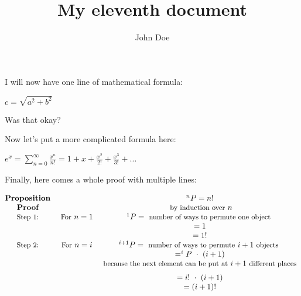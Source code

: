 \documentclass{article}
\title{My eleventh document}
\author{John Doe}
\renewcommand{\t}[1]{~\text{\small{#1}}~}
\begin{document}
   \maketitle
   I will now have one line of mathematical formula:
   
   $c = \sqrt{a^2 + b^2}$
   
   Was that okay?
   
   Now let's put a more complicated formula here:
   
   $e^x = \displaystyle\sum^{\infty}_{n=0} \frac{x^n}{n!}
        = 1 + x + \frac{x^2}{2!} + \frac{x^3}{3!} + ...$
   
   Finally, here comes a whole proof with multiple lines:
   
\[\begin{matrix}

\textbf{Proposition} &               & ^{n}P = n! \\
\textbf{Proof}       &               & \t{by induction over}n \\
\t{Step 1:}          & \t{For} n = 1 & ^{1}P = \t{number of ways to permute one object} \\
                     &               &= 1 \\
                     &               &= 1! \\
\t{Step 2:}          & \t{For} n = i & ^{i+1}P =\t{number of ways to permute} i+1 \t{objects} \\
                     &               &= ^{i}P ~\cdot~ (i+1) \\
                     &               & \t{because the next element can be put at}i+1\t{different places} \\[0.6em]
                     &               &= i! ~\cdot~ (i+1) \\
                     &               &= (i+1)!

\end{matrix}\]
   
   
\end{document}
